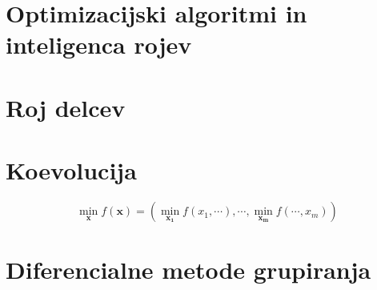 \section{Optimizacijski algoritmi in inteligenca rojev}


\section{Roj delcev}


\section{Koevolucija}

\begin{equation}
    \min_{\mathbf{x}}{f(\mathbf{x})} = \left( \min_{\mathbf{x_1}}{f(x_1,\cdots)}, \cdots , \min_{\mathbf{x_m}}{f(\cdots, x_m)} \right)
\end{equation}


\section{Diferencialne metode grupiranja}


